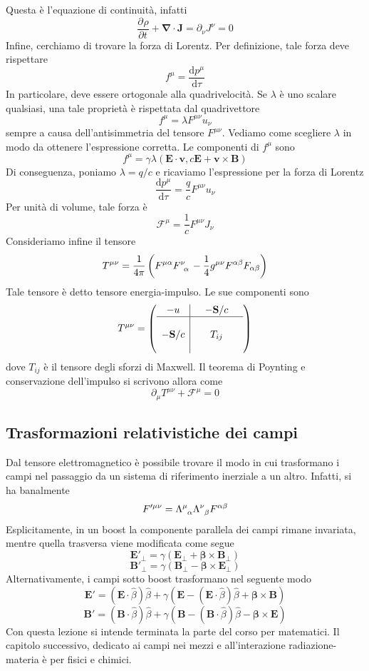 \documentclass[a4paper,11pt]{book}
\renewcommand{\d}{\mathrm{d}}
\newcommand{\der}[3][]{\frac{\partial ^{#1}#2}{\partial {#3}^{#1}}}
\let\oldnabla\nabla
\renewcommand{\nabla}{\vec{\oldnabla}}
\renewcommand{\vec}[1]{\mathbf{#1}}
\theoremstyle{theorem}
\theoremstyle{definition}
\begin{document}
Questa è l'equazione di continuità, infatti
\[\der{\rho}{t}+\nabla\cdot\vec{J}=\partial_\nu J^\nu=0\]
Infine, cerchiamo di trovare la forza di Lorentz. Per definizione, tale forza deve rispettare
\[f^\mu=\frac{\d p^\mu}{\d \tau}\]
In particolare, deve essere ortogonale alla quadrivelocità. Se $\lambda$ è uno scalare qualsiasi, una tale proprietà è rispettata dal quadrivettore
\[f^\mu=\lambda F^{\mu\nu}u_\nu\]
sempre a causa dell'antisimmetria del tensore $F^{\mu\nu}$. Vediamo come scegliere $\lambda$ in modo da ottenere l'espressione corretta. Le componenti di $f^\mu$ sono
\[f^\mu=\gamma\lambda(\vec{E}\cdot\vec{v},c\vec{E}+\vec{v}\times\vec{B})\]
Di conseguenza, poniamo $\lambda=q/c$ e ricaviamo l'espressione per la forza di Lorentz
\[\frac{\d p^\mu}{\d \tau}=\frac{q}{c}F^{\mu\nu}u_\nu\]
Per unità di volume, tale forza è
\[\mathscr{F}^\mu=\frac{1}{c}F^{\mu\nu}J_\nu\]
Consideriamo infine il tensore
\[T^{\mu\nu}=\frac{1}{4\pi}\left(F^{\mu\alpha}F\indices{^\nu_\alpha}-\frac{1}{4}g^{\mu\nu}F^{\alpha\beta}F_{\alpha\beta}\right)\]
Tale tensore è detto tensore energia-impulso. Le sue componenti sono
\[T^{\mu\nu}=\left(\begin{array}{c |c c c}
-u&&-\vec{S}/c&\\\hline&&&\\-\vec{S}/c&&T_{ij}&\\&&&
\end{array}\right)\]
dove $T_{ij}$ è il tensore degli sforzi di Maxwell. Il teorema di Poynting e conservazione dell'impulso si scrivono allora come
\[\partial_\mu T^{\mu\nu}+\mathscr{F}^\mu=0\]
\subsection{Trasformazioni relativistiche dei campi}
Dal tensore elettromagnetico è possibile trovare il modo in cui trasformano i campi nel passaggio da un sistema di riferimento inerziale a un altro. Infatti, si ha banalmente
\[F'^{\mu\nu}=\Lambda\indices{^\mu_\alpha}\Lambda\indices{^\nu_\beta}F^{\alpha\beta}\]
Esplicitamente, in un boost la componente parallela dei campi rimane invariata, mentre quella trasversa viene modificata come segue
\[\vec{E}'_\perp=\gamma(\vec{E}_\perp+\vec{\beta}\times\vec{B}_\perp)\]
\[\vec{B}'_\perp=\gamma(\vec{B}_\perp-\vec{\beta}\times\vec{E}_\perp)\]
Alternativamente, i campi sotto boost trasformano nel seguente modo
\[\vec{E}'=(\vec{E}\cdot\hat{\beta})\hat{\beta}+\gamma(\vec{E}-(\vec{E}\cdot\hat{\beta})\hat{\beta}+\vec{\beta}\times\vec{B})\]
\[\vec{B}'=(\vec{B}\cdot\hat{\beta})\hat{\beta}+\gamma(\vec{B}-(\vec{B}\cdot\hat{\beta})\hat{\beta}-\vec{\beta}\times\vec{E})\]
\newpage \noindent Con questa lezione si intende terminata la parte del corso per matematici. Il capitolo successivo, dedicato ai campi nei mezzi e all'interazione radiazione-materia è per fisici e chimici.
\end{document}

